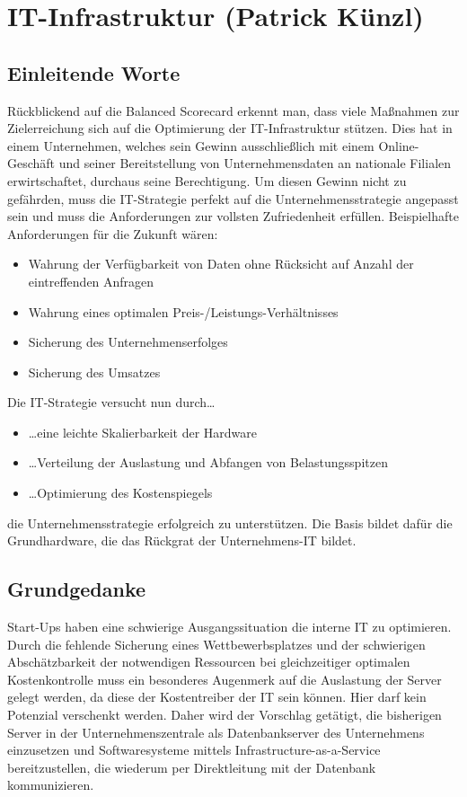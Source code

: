 \section{IT-Infrastruktur (Patrick Künzl)}
\label{sec:IT-Infrastruktur}
\subsection{Einleitende Worte}
Rückblickend auf die Balanced Scorecard erkennt man, dass viele Maßnahmen zur
Zielerreichung sich auf die Optimierung der IT-Infrastruktur stützen. Dies hat
in einem Unternehmen, welches sein Gewinn ausschließlich mit einem
Online-Geschäft und seiner Bereitstellung von Unternehmensdaten an nationale
Filialen erwirtschaftet, durchaus seine Berechtigung. Um diesen Gewinn nicht zu
gefährden, muss die IT-Strategie perfekt auf die Unternehmensstrategie angepasst
sein und muss die Anforderungen zur vollsten Zufriedenheit erfüllen.
Beispielhafte Anforderungen für die Zukunft wären:
\begin{itemize}
  \item Wahrung der Verfügbarkeit von Daten ohne Rücksicht auf Anzahl der
  eintreffenden Anfragen
  \item Wahrung eines optimalen Preis-/Leistungs-Verhältnisses
  \item Sicherung des Unternehmenserfolges
  \item Sicherung des Umsatzes
\end{itemize}
Die IT-Strategie versucht nun durch\ldots
\begin{itemize}
  \item \ldots eine leichte Skalierbarkeit der Hardware
  \item \ldots Verteilung der Auslastung und Abfangen von Belastungsspitzen
  \item \ldots Optimierung des Kostenspiegels
\end{itemize}
die Unternehmensstrategie erfolgreich zu unterstützen. Die Basis bildet dafür
die \glqq Grundhardware\glqq, die das Rückgrat der Unternehmens-IT bildet.
\subsection{Grundgedanke}
Start-Ups haben eine schwierige Ausgangssituation die interne IT zu optimieren.
Durch die fehlende Sicherung eines Wettbewerbsplatzes und der schwierigen
Abschätzbarkeit der notwendigen Ressourcen bei gleichzeitiger optimalen
Kostenkontrolle muss ein besonderes Augenmerk auf die Auslastung der Server
gelegt werden, da diese der Kostentreiber der IT sein können. Hier darf kein
Potenzial verschenkt werden. Daher wird der Vorschlag getätigt, die bisherigen
Server in der Unternehmenszentrale als Datenbankserver des Unternehmens
einzusetzen und Softwaresysteme mittels Infrastructure-as-a-Service
bereitzustellen, die wiederum per Direktleitung mit der Datenbank kommunizieren.
